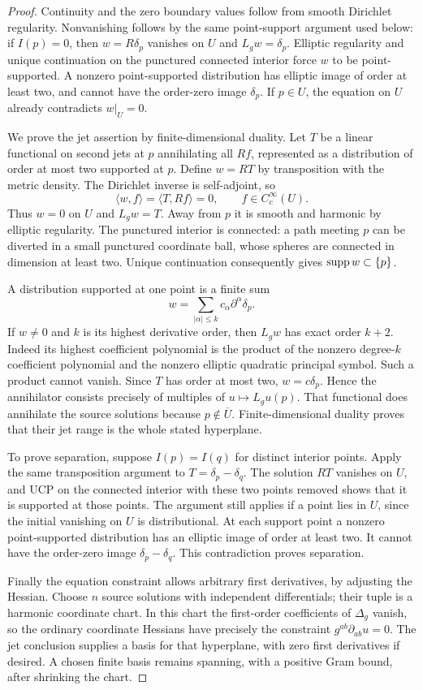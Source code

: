 \begin{proof}
Continuity and the zero boundary values follow from smooth Dirichlet
regularity. Nonvanishing follows by the same point-support argument
used below: if $I(p)=0$, then $w=R\delta_p$ vanishes on $U$ and
$L_gw=\delta_p$. Elliptic regularity and unique continuation on
the punctured connected interior force $w$ to be point-supported.
A nonzero point-supported distribution has elliptic image of order
at least two, and cannot have the order-zero image $\delta_p$.
If $p\in U$, the equation on $U$ already contradicts $w|_U=0$.

We prove the jet assertion by finite-dimensional duality. Let $T$
be a linear functional on second jets at $p$ annihilating all
$Rf$, represented as a distribution of order at most two supported
at $p$. Define $w=RT$ by transposition with the metric density.
The Dirichlet inverse is self-adjoint, so
\[
 \langle w,f\rangle=\langle T,Rf\rangle=0,
           \qquad f\in C_c^\infty(U).
\]
Thus $w=0$ on $U$ and $L_gw=T$. Away from $p$ it is smooth and
harmonic by elliptic regularity. The punctured interior is connected:
a path meeting $p$ can be diverted in a small punctured coordinate
ball, whose spheres are connected in dimension at least two.
Unique continuation consequently gives $\operatorname{supp} w\subset\{p\}$.

A distribution supported at one point is a finite sum
\[
 w=\sum_{|\alpha|\le k}c_\alpha\partial^\alpha\delta_p.
\]
If $w\ne0$ and $k$ is its highest derivative order, then $L_gw$
has exact order $k+2$. Indeed its highest coefficient polynomial
is the product of the nonzero degree-$k$ coefficient polynomial
and the nonzero elliptic quadratic principal symbol. Such a product
cannot vanish. Since $T$ has order at most two, $w=c\delta_p$.
Hence the annihilator consists precisely of multiples of
$u\mapsto L_gu(p)$. That functional does annihilate the source
solutions because $p\notin\overline U$. Finite-dimensional duality
proves that their jet range is the whole stated hyperplane.

To prove separation, suppose $I(p)=I(q)$ for distinct interior
points. Apply the same transposition argument to
$T=\delta_p-\delta_q$. The solution $RT$ vanishes on $U$,
and UCP on the connected interior with these two points removed
shows that it is supported at those points. The argument still
applies if a point lies in $U$, since the initial vanishing on $U$
is distributional. At each support point a nonzero point-supported
distribution has an elliptic image of order at least two.
It cannot have the order-zero image $\delta_p-\delta_q$.
This contradiction proves separation.

Finally the equation constraint allows arbitrary first derivatives,
by adjusting the Hessian. Choose $n$ source solutions with independent
differentials; their tuple is a harmonic coordinate chart. In this
chart the first-order coefficients of $\Delta_g$ vanish, so the
ordinary coordinate Hessians have precisely the constraint
$g^{ab}\partial_{ab}u=0$. The jet conclusion supplies a basis for
that hyperplane, with zero first derivatives if desired. A chosen
finite basis remains spanning, with a positive Gram bound, after
shrinking the chart.
\end{proof}


